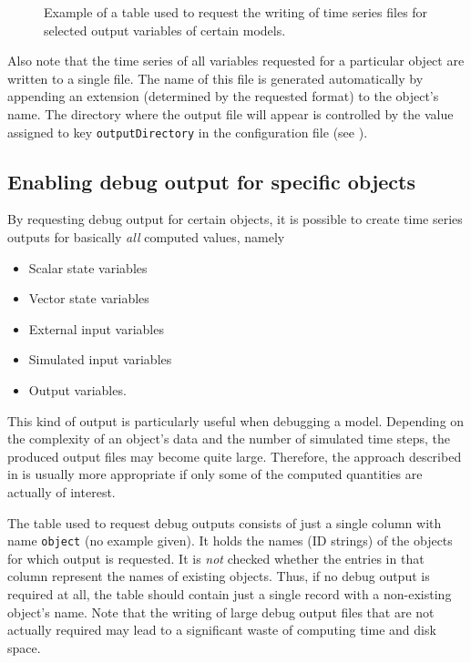 \begin{figure*}[htbp]
  
  \caption{Example of a table used to request the writing of time series files for selected output variables of certain models.
 \label{fig:input-outputSelected}}
\end{figure*}

Also note that the time series of all variables requested for a particular object are written to a single file. The name of this file is generated automatically by appending an extension (determined by the requested format) to the object's name. The directory where the output file will appear is controlled by the value assigned to key \verb!outputDirectory! in the configuration file (see ).

\subsection{Enabling debug output for specific objects} \label{sec:input-outputDebug} 

By requesting debug output for certain objects, it is possible to create time series outputs for basically \emph{all} computed values, namely
\begin{itemize}
  \item Scalar state variables
  \item Vector state variables
  \item External input variables
  \item Simulated input variables
  \item Output variables.
\end{itemize}

This kind of output is particularly useful when debugging a model. Depending on the complexity of an object's data and the number of simulated time steps, the produced output files may become quite large. Therefore, the approach described in  is usually more appropriate if only some of the computed quantities are actually of interest.

The table used to request debug outputs consists of just a single column with name \verb!object! (no example given). It holds the names (ID strings) of the objects for which output is requested. It is \emph{not} checked whether the entries in that column represent the names of existing objects. Thus, if no debug output is required at all, the table should contain just a single record with a non-existing object's name. Note that the writing of large debug output files that are not actually required may lead to a significant waste of computing time and disk space.

